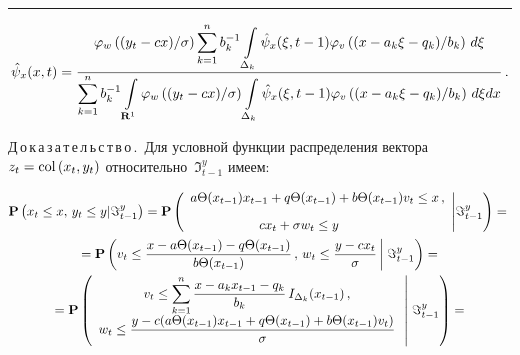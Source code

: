 \hrule

\vspace*{3pt}

  \begin{equation*}
  \hat{\psi}_x(x,t) = 
  \displaystyle\frac{\displaystyle \varphi_w \left( (y_t-cx)/\sigma\right) \sum\limits_{k=1}^n b_k^{-1} \int\limits_{\Delta_k}
\hat{\psi}_x (\xi,t-1)\varphi_v\left( (x-a_k\xi-q_k)/b_k\right)\,d\xi\mathstrut}{\displaystyle \sum\limits_{k=1}^n b_k^{-1} 
\int\limits_{\mathbf{R}^1} \varphi_w \left( (y_t-cx)/\sigma\right) 
  \int\limits_{\Delta_k} \hat{\psi}_x 
  (\xi,t-1)\varphi_v\left( (x-a_k\xi-q_k)/b_k\right)\,d\xi dx\mathstrut}\,.
  \end{equation*}
  
  \smallskip
  
  \noindent
  Д\,о\,к\,а\,з\,а\,т\,е\,л\,ь\,с\,т\,в\,о\,.\ Для условной функции распределения вектора $z_t\hm 
=\mathrm{col}\left( x_t,y_t\right)$ относительно~$\Im_{t-1}^y$ имеем:

\noindent
  \begin{multline*}
  \mathbf{P}\left(x_t\leq x,\,y_t\leq y\vert \Im_{t-1}^y\right)= \mathbf{P}\left(
  \begin{array}{c}
  a\Theta(x_{t-1})x_{t-1}+q\Theta(x_{t-1})+b\Theta(x_{t-1})v_t\leq x\,,\\[9pt]
\hspace*{-10mm}  cx_t+\sigma w_t\leq y
  \end{array}
\Bigg  \vert
   \Im_{t-1}^y
  \right)={}\\
    {}=\mathbf{P}\left( v_t\leq \fr{x-a\Theta(x_{t-1})-q\Theta(x_{t-1})}{b\Theta(x_{t-1})}\,,\, 
w_t\leq \fr{y-cx_t}{\sigma}\left\vert\vphantom{\fr{y-cx_t}{\sigma}} \right.
\Im_{t-1}^y\right)={}\\
{}= \mathbf{P}\left( 
\begin{array}{c}
v_t\leq \displaystyle\sum\limits_{k=1}^n \fr{x-a_kx_{t-1}-q_k}{b_k}\,I_{\Delta_k}(x_{t-
1})\,,\\[9pt]
w_t\leq \fr{y-c(a\Theta(x_{t-1})x_{t-1}+q\Theta(x_{t-1})+b\Theta(x_{t-1}) v_t)}{\sigma}
\end{array}
\left\vert\vphantom{\begin{array}{c}
v_t\leq \displaystyle\sum\limits_{k=1}^n \fr{x-a_kx_{t-1}-q_k}{b_k}\,I_{\Delta_k}(x_{t-
1})\,,\\[9pt]
w_t\leq \fr{y-c(a\Theta(x_{t-1})x_{t-1}+q\Theta(x_{t-1})+b\Theta(x_{t-1}) v_t)}{\sigma}
\end{array}}\right.
 \Im^y_{t-1}\right)={}
  \end{multline*}
  

